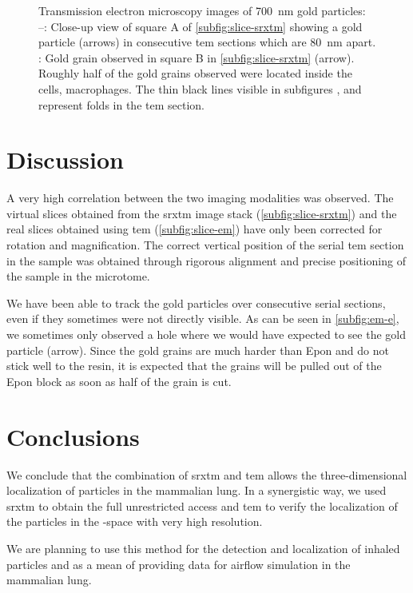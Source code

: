 \begin{figure}[htb]
{		\label{subfig:em-f}%
		}%
	\caption[Transmission electron microscopy images of gold particles]{Transmission electron microscopy images of \SI{700}{\nano\meter} gold particles: --: Close-up view of square A of \autoref{subfig:slice-srxtm} showing a gold particle (arrows) in consecutive \ac{tem} sections which are \SI{80}{\nano\meter} apart. : Gold grain observed in square B in \autoref{subfig:slice-srxtm} (arrow). Roughly half of the gold grains observed were located inside the cells, \eg macrophages. The thin black lines visible in subfigures ,  and  represent folds in the \ac{tem} section.}%
	\label{fig:srxtm-em}%
\end{figure}

\section{Discussion}
A very high correlation between the two imaging modalities was observed. The virtual slices obtained from the \ac{srxtm} image stack (\autoref{subfig:slice-srxtm}) and the real slices obtained using \ac{tem} (\autoref{subfig:slice-em}) have only been corrected for rotation and magnification. The correct vertical position of the serial \ac{tem} section in the sample was obtained through rigorous alignment and precise positioning of the sample in the microtome.

We have been able to track the gold particles over consecutive serial sections, even if they sometimes were not directly visible. As can be seen in \autoref{subfig:em-e}, we sometimes only observed a hole where we would have expected to see the gold particle (arrow). Since the gold grains are much harder than Epon and do not stick well to the resin, it is expected that the grains will be pulled out of the Epon block as soon as half of the grain is cut.

\section{Conclusions}
We conclude that the combination of \ac{srxtm} and \ac{tem} allows the three-dimensional localization of particles in the mammalian lung. In a synergistic way, we used \ac{srxtm} to obtain the full unrestricted \threed access and \ac{tem} to verify the localization of the particles in the \threed-space with very high resolution. 

We are planning to use this method for the detection and localization of inhaled particles and as a mean of providing data for airflow simulation in the mammalian lung.

